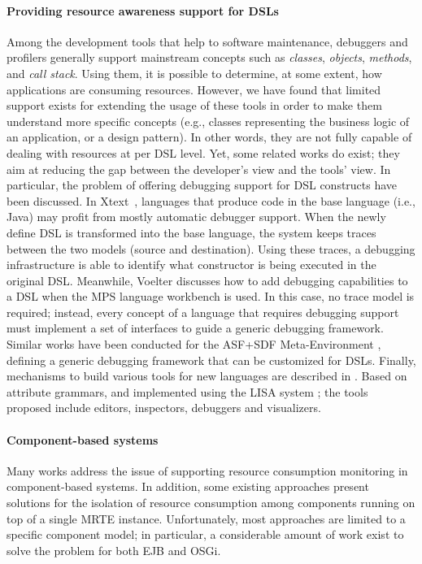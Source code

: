 \paragraph{Providing resource awareness support for DSLs}
Among the development tools that help to software maintenance, debuggers and profilers generally support mainstream concepts such as \textit{classes}, \textit{objects}, \textit{methods}, and \textit{call stack}.
Using them, it is possible to determine, at some extent, how applications are consuming resources.
However, we have found that limited support exists for extending the usage of these tools in order to make them understand more specific concepts (e.g., classes representing the business logic of an application, or a design pattern).
In other words, they are not fully capable of dealing with resources at per DSL level.
Yet, some related works do exist; they aim at reducing the gap between the developer's view and the tools' view.
In particular, the problem of offering debugging support for DSL constructs have been discussed.
In Xtext~\cite{Eysholdt:2010:XIY:1869542.1869625}, languages that produce code in the base language (i.e., Java) may profit from mostly automatic debugger support.
When the newly define DSL is transformed into the base language, the system keeps traces between the two models (source and destination).
Using these traces, a debugging infrastructure is able to identify what constructor is being executed in the original DSL.
Meanwhile, Voelter \cite{Voelter2010} discusses how to add debugging capabilities to a DSL when the MPS language workbench is used.
In this case, no trace model is required; instead, every concept of a language that requires debugging support must implement a set of interfaces to guide a generic debugging framework.
Similar works have been conducted \cite{vandenBrand:2005:TGD:1705513.1705667} for the ASF+SDF Meta-Environment \cite{vandenBrand20013}, defining a generic debugging framework that can be customized for DSLs.
Finally, mechanisms to build various tools for new languages are described in \cite{Henriques2005}.
Based on attribute grammars, and implemented using the LISA system \cite{Mernik2002}; the tools proposed include editors, inspectors, debuggers and visualizers.

\paragraph{Component-based systems}

Many works address the issue of supporting resource consumption monitoring in component-based systems.
In addition, some existing approaches present solutions for the isolation of resource consumption among components running on top of a single MRTE instance.
Unfortunately, most approaches are limited to a specific component model; in particular, a considerable amount of work exist to solve the problem for both EJB and OSGi.

